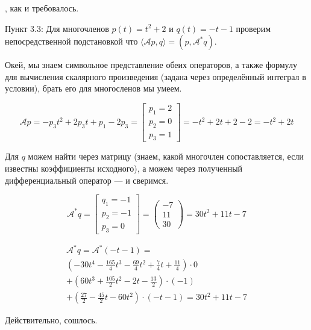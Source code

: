 \documentclass[12pt, a4paper]{article}
\begin{document}
    , как и требовалось.
    
    Пункт 3.3: Для многочленов $p(t)=t^{2}+2$ и $q(t)=-t-1$ проверим непосредственной подстановкой 
    что $\langle \mathcal{A} p, q \rangle =\left(p, \mathcal{A}^{*} q\right)$.

    Окей, мы знаем символьное представление обеих операторов, а также формулу для вычисления скалярного произведения (задана через определённый интеграл в условии),
    брать его для многосленов мы умеем.

    \begin{equation}
        \mathcal{A} p = -p_3 t^2 + 2 p_3 t + p_1 - 2 p_3 = \begin{bmatrix}
            p_1 = 2 \\ p_2 = 0 \\ p_3 = 1
        \end{bmatrix} = -t^2 + 2 t + 2 - 2 = -t^2 + 2 t
    \end{equation}

    Для $q$ можем найти через матрицу (знаем, какой многочлен сопоставляется, если известны коэффициенты исходного), 
    а можем через полученный дифференциальный оператор — и сверимся.

    \begin{equation}
        \mathcal{A}^* q = \begin{bmatrix}
            q_1 = -1 \\ p_2 = -1 \\ p_3 = 0
        \end{bmatrix} = \left(\begin{matrix}
            -7 \\
            11 \\
            30
        \end{matrix}\right) = 30 t^2 + 11t - 7
    \end{equation}

    \begin{multline}
        \mathcal{A}^* q = \mathcal{A}^* (-t - 1) = \\
        \left( -30 t^4 - \frac{165}{4} t^3 - \frac{69}{4} t^2 + \frac{7}{4} t + \frac{11}{4} \right) \cdot 0 \\
        + \left(60 t^3 + \frac{105}{2} t^2 -2t - \frac{13}{2}\right) \cdot (-1) \\
        + \left( \frac{27}{2} - \frac{45}{2} t - 60 t^2 \right) \cdot (-t - 1) = 30 t^2 + 11t - 7
    \end{multline}

    Действительно, сошлось.
\end{document}
